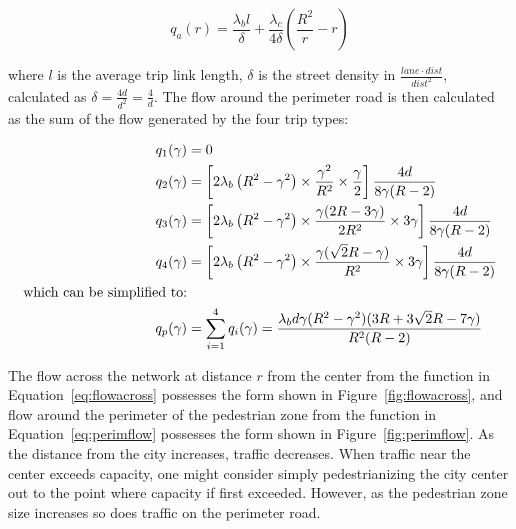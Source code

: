 \documentclass{article}
\begin{document}
\begin{equation}
    q_a(r) = \frac{\lambda_b l}{\delta} + \frac{\lambda_c}{4\delta} \left( \frac{R^2}{r} - r \right)
    \label{eq:flowacross}
\end{equation}

\noindent where $l$ is the average trip link length, $\delta$ is the street density in $\frac{lane \cdot dist}{dist^2}$, calculated as $\delta = \frac{4d}{d^2} = \frac{4}{d}$. The flow around the perimeter road is then calculated as the sum of the flow generated by the four trip types:

\begin{subequations}
\begin{align}
	q_1(\gamma) &= 0 \\
	q_2(\gamma) &= \left[2 \lambda_b \left(R^2 - \gamma^2\right) \times \frac{\gamma^2}{R^2} \times\frac{\gamma}{2}\right] \frac{4d}{8\gamma (R-2)}\\
	q_3(\gamma) &= \left[2 \lambda_b \left(R^2 - \gamma^2\right) \times \frac{\gamma (2R - 3\gamma)}{2R^2} \times  3\gamma\right] \frac{4d}{8\gamma (R-2)}\\
	q_4(\gamma) &= \left[2 \lambda_b \left(R^2 - \gamma^2\right) \times \frac{\gamma (\sqrt{2}R-\gamma)}{R^2} \times  3\gamma\right] \frac{4d}{8\gamma (R-2)}\\
	\notag\text{which can be simplified to:} & \\
	    q_p(\gamma) & = \sum\limits_{i=1}^4 q_i(\gamma) = \frac{\lambda_b d \gamma (R^2 - \gamma^2) (3R + 3\sqrt{2}R - 7\gamma)}{R^2(R-2)}
    \label{eq:perimflow}
\end{align}
\end{subequations}

\noindent The flow across the network at distance $r$ from the center from the function in Equation~\eqref{eq:flowacross} possesses the form shown in Figure~\ref{fig:flowacross}, and flow around the perimeter of the pedestrian zone from the function in Equation~\eqref{eq:perimflow} possesses the form shown in Figure~\ref{fig:perimflow}. As the distance from the city increases, traffic decreases. When traffic near the center exceeds capacity, one might consider simply pedestrianizing the city center out to the point where capacity if first exceeded. However, as the pedestrian zone size increases so does traffic on the perimeter road. 
\end{document}
